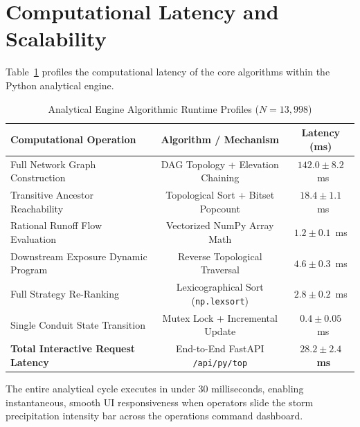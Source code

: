 \section{Computational Latency and Scalability}
Table~\ref{tab:runtime_scalability} profiles the computational latency of the core algorithms within the Python analytical engine.

\begin{table}[h!]
\centering
\caption{Analytical Engine Algorithmic Runtime Profiles ($N = 13{,}998$)}
\label{tab:runtime_scalability}
\begin{tabular}{|l|c|c|}
\hline
\textbf{Computational Operation} & \textbf{Algorithm / Mechanism} & \textbf{Latency (ms)} \\
\hline
Full Network Graph Construction & DAG Topology + Elevation Chaining & $142.0 \pm 8.2$~ms \\
Transitive Ancestor Reachability & Topological Sort + Bitset Popcount & $18.4 \pm 1.1$~ms \\
Rational Runoff Flow Evaluation & Vectorized NumPy Array Math & $1.2 \pm 0.1$~ms \\
Downstream Exposure Dynamic Program & Reverse Topological Traversal & $4.6 \pm 0.3$~ms \\
Full Strategy Re-Ranking & Lexicographical Sort (\texttt{np.lexsort}) & $2.8 \pm 0.2$~ms \\
Single Conduit State Transition & Mutex Lock + Incremental Update & $0.4 \pm 0.05$~ms \\
\hline
\textbf{Total Interactive Request Latency} & End-to-End FastAPI \texttt{/api/py/top} & \textbf{$28.2 \pm 2.4$~ms} \\
\hline
\end{tabular}
\end{table}

The entire analytical cycle executes in under 30 milliseconds, enabling instantaneous, smooth UI responsiveness when operators slide the storm precipitation intensity bar across the operations command dashboard.
